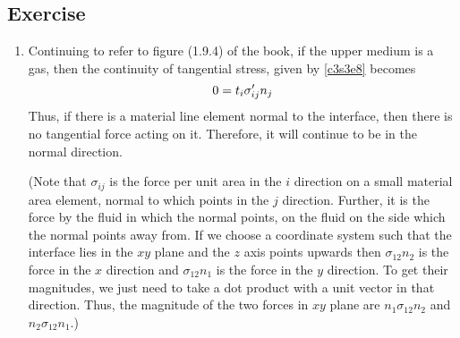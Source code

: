\subsection{Exercise}
\begin{enumerate}
\item Continuing to refer to figure (1.9.4) of the book, if the upper medium is a gas, then the continuity of tangential stress, given by \eqref{c3s3e8} becomes
\[
0 = t_i\sigma^\prime_{ij}n_j
\]
Thus, if there is a material line element normal to the interface, then there is no tangential force acting on it. Therefore, it will continue to be in the normal direction.

(Note that $\sigma_{ij}$ is the force per unit area in the $i$ direction on a small material area element, normal to which points in the $j$ direction. Further, it is the force by the
fluid in which the normal points, on the fluid on the side which the normal points away from. If we choose a coordinate system such that the interface lies in the $xy$ plane and the $z$
axis points upwards then $\sigma_{12}n_2$ is the force in the $x$ direction and $\sigma_{12}n_1$ is the force in the $y$ direction. To get their magnitudes, we just need to take a
dot product with a unit vector in that direction. Thus, the magnitude of the two forces in $xy$ plane are $n_1\sigma_{12}n_2$ and $n_2\sigma_{12}n_1$.)
\end{enumerate}

